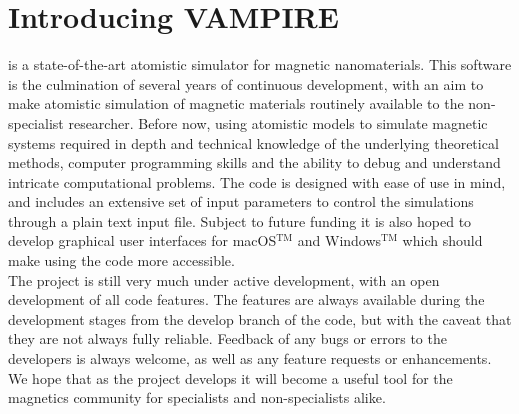 \chapter*{Introducing {\Huge VAMPIRE}}
\vampire is a state-of-the-art atomistic simulator for magnetic nanomaterials.
This software is the culmination of several years of continuous development,
with an aim to make atomistic simulation of magnetic materials routinely
available to the non-specialist researcher. Before now, using atomistic
models to simulate magnetic systems required in depth and technical knowledge
of the underlying theoretical methods, computer programming skills and the
ability to debug and understand intricate computational problems. The code is
designed with ease of use in mind, and includes an extensive set of input
parameters to control the simulations through a plain text input file. Subject
to future funding it is also hoped to develop graphical user interfaces for
macOS$^{\mathrm{TM}}$ and Windows$^{\mathrm{TM}}$ which should make using
the code more accessible.\\

The \vampire project is still very much under active development, with an open
development of all code features. The features are always available during the
development stages from the develop branch of the code, but with the caveat that
they are not always fully reliable. Feedback of any bugs or errors to the
\vampire developers is always welcome, as well as any feature requests or
enhancements.\\

We hope that as the \vampire project develops it will become a useful tool for
the magnetics community for specialists and non-specialists alike.\\
